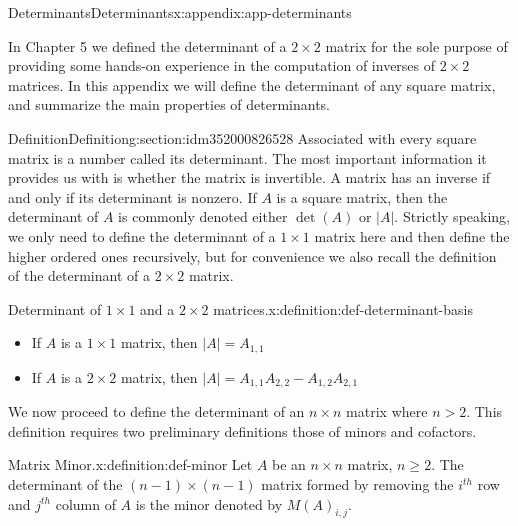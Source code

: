 \documentclass[oneside,10pt,]{book}
\begin{document}
\begin{appendixptx}{Determinants}{}{Determinants}{}{}{x:appendix:app-determinants}
\begin{introduction}{}%
In Chapter 5 we defined the determinant of a \(2 \times 2\) matrix for the sole purpose of providing some hands-on experience in the computation of inverses of \(2 \times 2\) matrices. In this appendix we will define the determinant of any square matrix, and summarize the main properties of determinants.%
\end{introduction}%
%
%
\typeout{************************************************}
\typeout{************************************************}
%
\begin{sectionptx}{Definition}{}{Definition}{}{}{g:section:idm352000826528}
Associated with every square matrix is a number called its determinant. The most important information it provides us with is whether the matrix is invertible. A matrix has an inverse if and only if its determinant is nonzero.  If \(A\) is a square matrix, then the determinant of \(A\) is commonly denoted either \(\det(A)\)  or \(\lvert A \rvert\).   Strictly speaking, we only need to define the determinant of a \(1 \times 1\) matrix here and then define the higher ordered ones recursively, but for convenience we also recall the definition of the determinant of a \(2 \times 2\) matrix.%
\begin{definition}{Determinant of \(1 \times 1\) and a \(2 \times 2\) matrices.}{x:definition:def-determinant-basis}%
%
%
\begin{itemize}[label=\textbullet]
\item{}If \(A\) is a \(1 \times 1\) matrix, then \(\lvert A \rvert = A_{1,1}\)%
\item{}If \(A\) is a \(2 \times 2\) matrix, then \(\lvert A \rvert = A_{1,1} A_{2,2} - A_{1,2} A_{2,1}\)%
\end{itemize}
%
\end{definition}
We now proceed to define the determinant of an \(n \times n\) matrix where \(n > 2\). This definition requires two preliminary definitions those of minors and cofactors.%
\begin{definition}{Matrix Minor.}{x:definition:def-minor}%
%
\label{g:notation:idm352000813200}%
Let \(A\) be an \(n \times n\) matrix, \(n \geq 2\). The determinant of the \((n-1) \times (n-1)\) matrix formed by removing the \(i^{th}\) row and  \(j^{th}\) column of \(A\) is the minor denoted by \(M(A)_{i,j}\).%

\end{definition}
\end{sectionptx}
\end{appendixptx}
\end{document}

